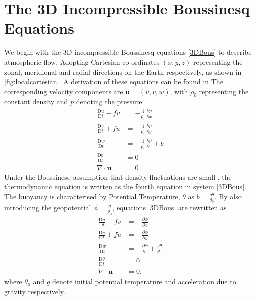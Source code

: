 \section{The 3D Incompressible Boussinesq Equations}
We begin with the $3$D incompressible Boussinesq equations \ref{3DBous} to describe atmospheric flow. Adopting Cartesian co-ordinates $\left(x,y,z\right)$ representing the zonal, meridional and radial directions on the Earth respectively, as shown in \ref{fig:localcartesian}. A derivation of these equations can be found in \cite{McWilliams2006} The corresponding velocity components are $\bm{u}=\left(u,v,w\right)$, with $\rho_0$ representing the constant density and $p$ denoting the pressure.
\begin{equation}
	\begin{aligned}
		\frac{\mathrm{D}u}{\mathrm{D}t}	- fv  &= -\frac{1}{\rho_0}\frac{\partial p}{\partial x}\\
		\frac{\mathrm{D}v}{\mathrm{D}t}	+ fu  &= -\frac{1}{\rho_0}\frac{\partial p}{\partial y}\\
		\frac{\mathrm{D}w}{\mathrm{D}t} &= -\frac{1}{\rho_0}\frac{\partial p}{\partial z} + b\\
		\frac{\mathrm{D} b}{\mathrm{D}t} &= 0\\
		\nabla \cdot \bm{u} &= 0
	\end{aligned}
\label{3DBous}
\end{equation}
Under the Boussinesq assumption that density fluctuations are small \cite{McWilliams2006}, the thermodynamic equation is written as the fourth equation in system \ref{3DBous}. The buoyancy is characterised by Potential Temperature, $\theta$ as $b = \frac{g\theta}{\theta_0}$. By also introducing the geopotential $\phi = \frac{p}{\rho_0}$, equations \ref{3DBous} are rewritten as
\begin{equation}
	\begin{aligned}
		\frac{\mathrm{D}u}{\mathrm{D}t}	- fv  &= -\frac{\partial \phi}{\partial x}\\
		\frac{\mathrm{D}v}{\mathrm{D}t}	+ fu  &= -\frac{\partial \phi}{\partial y}\\
		\frac{\mathrm{D}w}{\mathrm{D}t} &= -\frac{\partial \phi}{\partial z} + \frac{g\theta}{\theta_0}\\
		\frac{\mathrm{D} \theta}{\mathrm{D}t} &= 0\\
		\nabla \cdot \bm{u} &= 0,
	\end{aligned}
\label{3DBousPT}
\end{equation}
where $\theta_0$ and $g$ denote initial potential temperature and acceleration due to gravity respectively. \\
